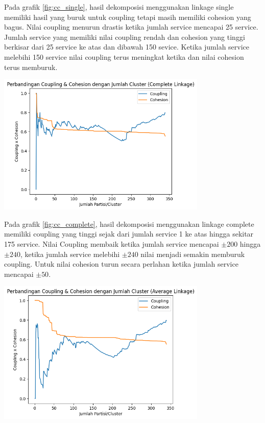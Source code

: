  Pada grafik \ref{fig:cc_single}, hasil dekomposisi menggunakan linkage single memiliki hasil yang buruk untuk coupling tetapi masih memiliki cohesion yang bagus. Nilai coupling menurun drastis ketika jumlah service mencapai 25 service. Jumlah service yang memiliki nilai coupling rendah dan cohesion yang tinggi berkisar dari 25 service ke atas dan dibawah 150 sevice. Ketika jumlah service melebihi 150 service nilai coupling terus meningkat ketika dan nilai cohesion terus memburuk.
 
\begin{center}
	\includegraphics[width=10cm]{img/bab_4/cc_comp.png}
	\label{fig:cc_complete}
\end{center}

Pada grafik \ref{fig:cc_complete}, hasil dekomposisi menggunakan linkage complete memiliki coupling yang tinggi sejak dari jumlah service 1 ke atas hingga sekitar 175 service. Nilai Coupling membaik ketika jumlah service mencapai   $\pm 200$  hingga  $\pm 240$, ketika jumlah service melebihi  $\pm 240$ nilai menjadi semakin memburuk coupling. Untuk nilai cohesion turun secara perlahan ketika jumlah service mencapai  $\pm 50$.

\begin{center}
	\includegraphics[width=10cm]{img/bab_4/cc_avg.png}
	\label{fig:cc_avg}
\end{center}

